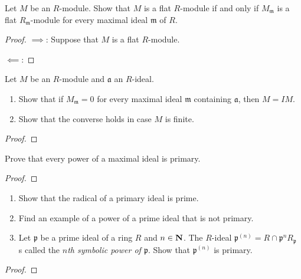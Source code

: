 \newpage
\begin{problem}
Let $M$ be an $R$-module. Show that $M$ is a flat $R$-module if
and only if $M_{\mathfrak{m}}$ is a flat
$R_{\mathfrak{m}}$-module for every maximal ideal $\mathfrak{m}$
of $R$.
\end{problem}
\begin{proof}
$\implies$: Suppose that $M$ is a flat $R$-module.

$\impliedby$:
\end{proof}
\newpage
\begin{problem}
Let $M$ be an $R$-module and $\mathfrak{a}$ an $R$-ideal.
\begin{enumerate}[noitemsep,label=(\alph*)]
\item Show that if $M_{\mathfrak{m}}=0$ for every maximal ideal
  $\mathfrak{m}$ containing $\mathfrak{a}$, then $M=IM$.
\item Show that the converse holds in case $M$ is finite.
\end{enumerate}
\end{problem}
\begin{proof}
\end{proof}
\newpage
\begin{problem}
Prove that every power of a maximal ideal is primary.
\end{problem}
\begin{proof}
\end{proof}
\newpage
\begin{problem}
\begin{enumerate}[noitemsep,label=(\alph*)]
\item Show that the radical of a primary ideal is prime.
\item Find an example of a power of a prime ideal that is not
  primary.
\item Let $\mathfrak{p}$ be a prime ideal of a ring $R$ and
  $n\in\mathbf{N}$. The $R$-ideal
  $\mathfrak{p}^{(n)}=R\cap\mathfrak{p}^nR_{\mathfrak{p}}$ s
  called the \emph{$n$th symbolic power of $\mathfrak{p}$}. Show
  that $\mathfrak{p}^{(n)}$ is primary.
\end{enumerate}
\end{problem}
\begin{proof}
\end{proof}

